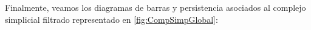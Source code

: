 \documentclass[12pt, a4paper, twoside]{book}
\numberwithin{equation}{section}
\theoremstyle{definition}
\newenvironment{ejem}
  {\pushQED{\qed}\renewcommand{\qedsymbol}{$\blacktriangleleft$}\ejemplo}
  {\popQED\endejemplo}
\theoremstyle{remark}
\theoremstyle{plain}
\begin{document}
\begin{ejem}
	Finalmente, veamos los diagramas de barras y persistencia asociados al
	complejo simplicial filtrado representado en \ref{fig:CompSimpGlobal}:
	\begin{figure}[H]
			\begin{figure}[H]
			\end{figure}
		\endminipage
			\begin{figure}[H]

\end{figure}
\end{figure}
\end{ejem}
\end{document}
